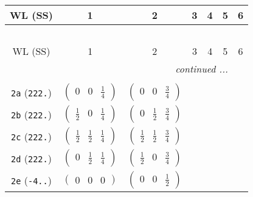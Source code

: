 \documentclass[fleqn,9pt,landscape]{jsarticle}
\begin{document}
\begin{center}
\renewcommand{\arraystretch}{1.2}
\begin{longtable}{ccccccc}
 \hline \hline
WL (SS) & 1 & 2 & 3 & 4 & 5 & 6 \\ \hline \endfirsthead

\multicolumn{6}{l}{\tablename\ \thetable{}} \\
 \hline \hline
WL (SS) & 1 & 2 & 3 & 4 & 5 & 6 \\ \hline \endhead

 \hline \hline
\multicolumn{6}{r}{\footnotesize\it continued ...} \\ \endfoot

 \hline \hline
\multicolumn{6}{r}{} \\ \endlastfoot

{\tt 2a} ({\tt 222.}) & $ \begin{pmatrix} 0 & 0 & \frac{1}{4} \end{pmatrix} $ & $ \begin{pmatrix} 0 & 0 & \frac{3}{4} \end{pmatrix} $ & $  $ & $  $ & $  $ & $  $ \\ \hline
{\tt 2b} ({\tt 222.}) & $ \begin{pmatrix} \frac{1}{2} & 0 & \frac{1}{4} \end{pmatrix} $ & $ \begin{pmatrix} 0 & \frac{1}{2} & \frac{3}{4} \end{pmatrix} $ & $  $ & $  $ & $  $ & $  $ \\ \hline
{\tt 2c} ({\tt 222.}) & $ \begin{pmatrix} \frac{1}{2} & \frac{1}{2} & \frac{1}{4} \end{pmatrix} $ & $ \begin{pmatrix} \frac{1}{2} & \frac{1}{2} & \frac{3}{4} \end{pmatrix} $ & $  $ & $  $ & $  $ & $  $ \\ \hline
{\tt 2d} ({\tt 222.}) & $ \begin{pmatrix} 0 & \frac{1}{2} & \frac{1}{4} \end{pmatrix} $ & $ \begin{pmatrix} \frac{1}{2} & 0 & \frac{3}{4} \end{pmatrix} $ & $  $ & $  $ & $  $ & $  $ \\ \hline
{\tt 2e} ({\tt -4..}) & $ \begin{pmatrix} 0 & 0 & 0 \end{pmatrix} $ & $ \begin{pmatrix} 0 & 0 & \frac{1}{2} \end{pmatrix} $ & $  $ & $  $ & $  $ & $  $ \\ \hline

\end{longtable}
\end{center}
\end{document}

